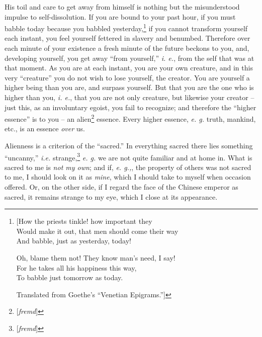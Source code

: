 \documentclass[12pt,a4paper]{book}
\begin{document}
His toil and care to get away from himself is nothing but the misunderstood 
impulse to self-dissolution. If you are bound to your past hour, if you must 
babble today because you babbled yesterday,\footnote{[How the priests tinkle! 
how important they\\
 Would make it out, that men should come their way\\
 And babble, just as yesterday, today!

Oh, blame them not! They know man's need, I say!\\
 For he takes all his happiness this way,\\
 To babble just tomorrow as today.

Translated from Goethe's ``Venetian Epigrams.'']

} if you cannot transform yourself each instant, you feel yourself fettered in 
slavery and benumbed. Therefore over each minute of your existence a fresh 
minute of the future beckons to you, and, developing yourself, you get away 
``from yourself,'' \textit{i. e.}, from the self that was at that moment. As 
you are at each instant, you are your own creature, and in this very 
``creature'' you do not wish to lose yourself, the creator. You are yourself 
a higher being than you are, and surpass yourself. But that you are the one 
who is higher than you, \textit{i. e.}, that you are not only creature, but 
likewise your creator -- just this, as an involuntary egoist, you fail to 
recognize; and therefore the ``higher essence'' is to you -- an 
alien\footnote{[\textit{fremd}]} essence. Every higher essence, \textit{e. g.} 
truth, mankind, etc., is an essence \textit{over} us.

Alienness is a criterion of the ``sacred.'' In everything sacred there lies 
something ``uncanny,'' \textit{i.e.} strange,\footnote{[\textit{fremd}]} 
\textit{e. g.} we are not quite familiar and at home in. What is sacred to me 
is \textit{not my own}; and if, \textit{e. g.,}, the property of others was 
not sacred to me, I should look on it as \textit{mine}, which I should take to 
myself when occasion offered. Or, on the other side, if I regard the face of 
the Chinese emperor as sacred, it remains strange to my eye, which I close at 
its appearance.
\end{document}
